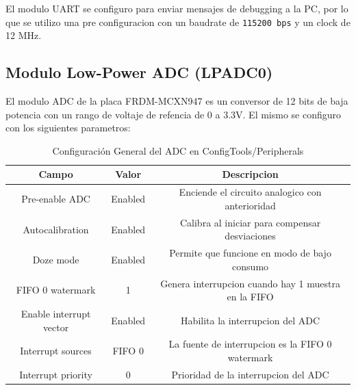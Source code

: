 \documentclass[11pt,a4paper]{article}
\begin{document}
El modulo UART se configuro para enviar mensajes de debugging a la PC, por lo
que se utilizo una pre configuracion con un baudrate de \texttt{115200 bps} y
un clock de 12 MHz.

\subsection{Modulo Low-Power ADC (LPADC0)}

El modulo ADC de la placa FRDM-MCXN947 es un conversor de 12 bits de baja
potencia con un rango de voltaje de refencia de 0 a 3.3V. El mismo se configuro
con los siguientes parametros:

\begin{table}[H]
    \centering
    \begin{tabular}{|c|c|c|}
        \hline
        \textbf{Campo}          & \textbf{Valor} & \textbf{Descripcion}                                \\
        \hline
        Pre-enable ADC          & Enabled        & Enciende el circuito analogico con anterioridad     \\
        Autocalibration         & Enabled        & Calibra al iniciar para compensar desviaciones      \\
        Doze mode               & Enabled        & Permite que funcione en modo de bajo consumo        \\
        FIFO 0 watermark        & 1              & Genera interrupcion cuando hay 1 muestra en la FIFO \\
        Enable interrupt vector & Enabled        & Habilita la interrupcion del ADC                    \\
        Interrupt sources       & FIFO 0         & La fuente de interrupcion es la FIFO 0 watermark    \\
        Interrupt priority      & 0              & Prioridad de la interrupcion del ADC                \\
        \hline
    \end{tabular}
    \caption{Configuración General del ADC en ConfigTools/Peripherals}
\end{table}
\end{document}

